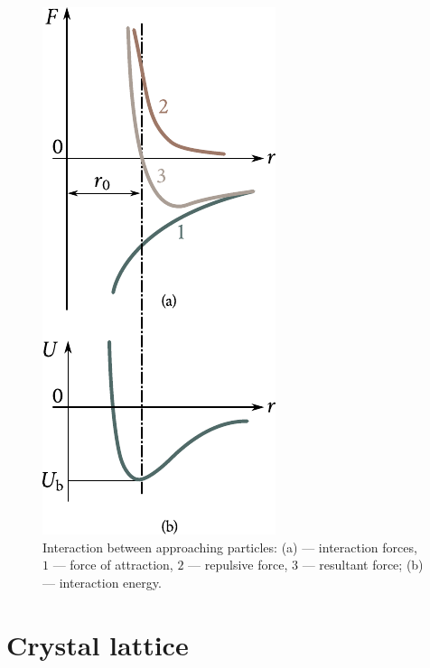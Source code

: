 \begin{figure}[t]
	\begin{center}
		\includegraphics[scale=0.95]{figures/ch_01/fig_1_10.pdf}
		\caption[]{Interaction between approaching particles: (a) --- interaction forces, $1$ --- force of attraction, $2$ --- repulsive force, $3$ --- resultant force; (b) --- interaction energy.}
		\label{fig:1_10}
	\end{center}
	\vspace{-0.7cm}
\end{figure}

\section{Crystal lattice}\label{sec:8}

